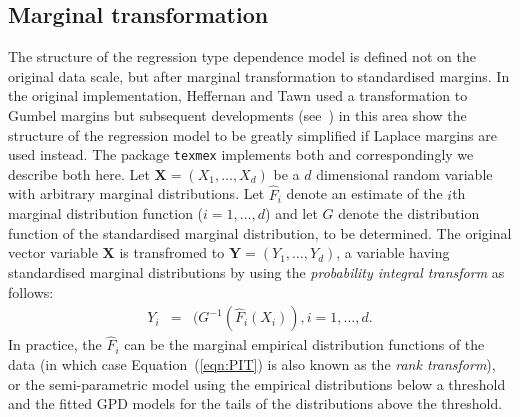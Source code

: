 \documentclass[10pt]{article}\usepackage[]{graphicx}\usepackage[]{color}
\def\bX{\boldsymbol X}
\def\bY{\boldsymbol Y}
\begin{document}
\subsection{Marginal transformation}
%
The structure of the regression type dependence model is defined not on the original data scale, but after marginal transformation to standardised margins.  In the original implementation, Heffernan and Tawn used a transformation to Gumbel margins but subsequent developments (see~\cite{KeefEtAl2013}) in this area show the structure of the regression model to be greatly simplified if Laplace margins are used instead.  The package {\tt texmex} implements both and correspondingly we describe both here.  Let $\bX = (X_1,\ldots,X_d)$ be a $d$ dimensional random variable with arbitrary marginal distributions.  Let $\hat F_i$ denote an estimate of the $i$th marginal distribution function ($i=1,\ldots,d$) and let $G$ denote the distribution function of the standardised marginal distribution, to be determined.  The original vector variable $\bX$ is transfromed to $\bY=(Y_1,\ldots,Y_d)$, a variable having standardised marginal distributions by using the \emph{probability integral transform} as follows:
  \begin{eqnarray}
\label{eqn:PIT}
Y_i &=& (G^{-1}(\hat F_i(X_i)), i=1,\ldots,d.
\end{eqnarray}
In practice, the $\hat F_i$ can be the marginal empirical distribution functions of the data (in which case
Equation~(\ref{eqn:PIT}) is also known as the \emph{rank transform}), or the semi-parametric model using the empirical
distributions below a threshold and the fitted GPD models for the tails of the distributions above the threshold.
%
\end{document}
